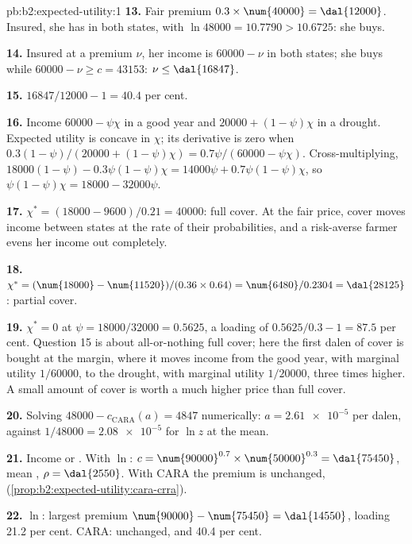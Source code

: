 \begin{solution}{pb:b2:expected-utility:1}
\textbf{13.} Fair premium $0.3 \times \num{40000} = \dal{12000}$. Insured, she has  in both
states, with $\ln\num{48000} = 10.7790 > 10.6725$: she buys.

\textbf{14.} Insured at a premium $\nu$, her income is $\num{60000} - \nu$ in both states; she buys while $\num{60000}
- \nu \ge c = \num{43153}$: $\nu \le \dal{16847}$.

\textbf{15.} $\num{16847}/\num{12000} - 1 = 40.4$ per cent.

\textbf{16.} Income $\num{60000} - \psi\chi$ in a good year and $\num{20000} + (1 - \psi)\chi$ in a drought. Expected
utility is concave in $\chi$; its derivative is zero when $0.3(1 - \psi)/(\num{20000} + (1 - \psi)\chi) =
0.7\psi/(\num{60000} - \psi\chi)$. Cross-multiplying, $\num{18000}(1 - \psi) - 0.3\psi (1 - \psi)\chi  = \num{14000}\psi  + 0.7\psi (1 -
\psi)\chi$, so $\psi (1 - \psi)\chi  = \num{18000} - \num{32000}\psi$.

\textbf{17.} $\chi^{*} = (\num{18000} - \num{9600})/0.21 = \num{40000}$: full cover. At the fair price,
cover moves income between states at the rate of their probabilities, and a risk-averse farmer evens
her income out completely.

\textbf{18.} $\chi^{*} = (\num{18000} - \num{11520})/(0.36 \times 0.64) = \num{6480}/0.2304 =
\dal{28125}$: partial cover.

\textbf{19.} $\chi^{*} = 0$ at $\psi  = \num{18000}/\num{32000} = 0.5625$, a loading of $0.5625/0.3 - 1 = 87.5$
per cent. Question 15 is about all-or-nothing full cover; here the first dalen of cover is bought at
the margin, where it moves income from the good year, with marginal utility $1/\num{60000}$, to the
drought, with marginal utility $1/\num{20000}$, three times higher. A small amount of cover is worth a
much higher price than full cover.

\textbf{20.} Solving $\num{48000} - c_{\mathrm{CARA}}(a) = \num{4847}$ numerically: $a =
\num{2.61e-5}$ per dalen, against $1/\num{48000} = \num{2.08e-5}$ for $\ln z$ at the mean.

\textbf{21.} Income  or . With $\ln$: $c = \num{90000}^{0.7} \times
\num{50000}^{0.3} = \dal{75450}$, mean , $\rho = \dal{2550}$. With CARA the premium is
unchanged,  (\cref{prop:b2:expected-utility:cara-crra}).

\textbf{22.} $\ln$: largest premium $\num{90000} - \num{75450} = \dal{14550}$, loading 21.2 per cent.
CARA: unchanged,  and 40.4 per cent.


\end{solution}
